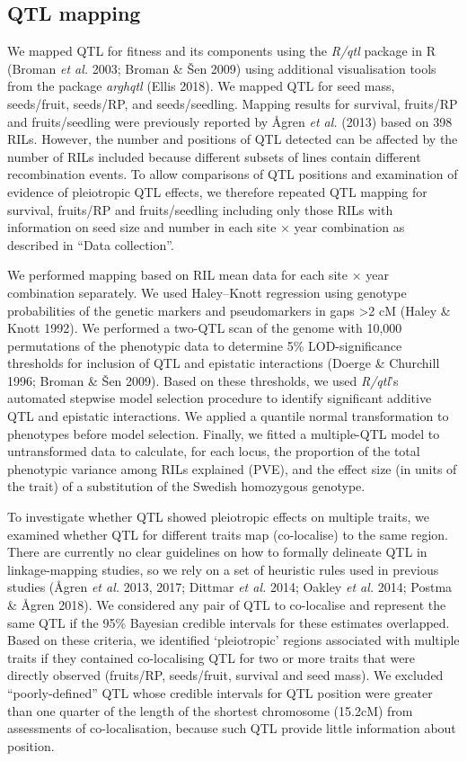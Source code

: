 \documentclass[]{article}
\begin{document}
\hypertarget{qtl-mapping}{%
\subsection{QTL mapping}\label{qtl-mapping}}

We mapped QTL for fitness and its components using the \emph{R/qtl} package in R (Broman \emph{et al.} 2003; Broman \& Šen 2009) using additional visualisation tools from the package \emph{arghqtl} (Ellis 2018). We mapped QTL for seed mass, seeds/fruit, seeds/RP, and seeds/seedling. Mapping results for survival, fruits/RP and fruits/seedling were previously reported by Ågren \emph{et al.} (2013) based on 398 RILs. However, the number and positions of QTL detected can be affected by the number of RILs included because different subsets of lines contain different recombination events. To allow comparisons of QTL positions and examination of evidence of pleiotropic QTL effects, we therefore repeated QTL mapping for survival, fruits/RP and fruits/seedling including only those RILs with information on seed size and number in each site × year combination as described in ``Data collection''.

We performed mapping based on RIL mean data for each site × year combination separately. We used Haley--Knott regression using genotype probabilities of the genetic markers and pseudomarkers in gaps \textgreater{}2 cM (Haley \& Knott 1992). We performed a two-QTL scan of the genome with 10,000 permutations of the phenotypic data to determine 5\% LOD-significance thresholds for inclusion of QTL and epistatic interactions (Doerge \& Churchill 1996; Broman \& Šen 2009). Based on these thresholds, we used \emph{R/qtl}'s automated stepwise model selection procedure to identify significant additive QTL and epistatic interactions. We applied a quantile normal transformation to phenotypes before model selection. Finally, we fitted a multiple-QTL model to untransformed data to calculate, for each locus, the proportion of the total phenotypic variance among RILs explained (PVE), and the effect size (in units of the trait) of a substitution of the Swedish homozygous genotype.

To investigate whether QTL showed pleiotropic effects on multiple traits, we examined whether QTL for different traits map (co-localise) to the same region. There are currently no clear guidelines on how to formally delineate QTL in linkage-mapping studies, so we rely on a set of heuristic rules used in previous studies (Ågren \emph{et al.} 2013, 2017; Dittmar \emph{et al.} 2014; Oakley \emph{et al.} 2014; Postma \& Ågren 2018). We considered any pair of QTL to co-localise and represent the same QTL if the 95\% Bayesian credible intervals for these estimates overlapped. Based on these criteria, we identified `pleiotropic' regions associated with multiple traits if they contained co-localising QTL for two or more traits that were directly observed (fruits/RP, seeds/fruit, survival and seed mass). We excluded ``poorly-defined'' QTL whose credible intervals for QTL position were greater than one quarter of the length of the shortest chromosome (15.2cM) from assessments of co-localisation, because such QTL provide little information about position.
\end{document}
